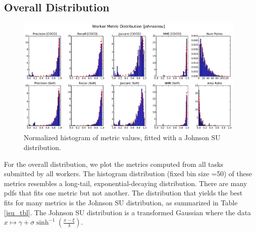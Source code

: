 \documentclass[12pt]{article}
\begin{document}
\subsection{Overall Distribution}
\begin{figure}[ht]
\centering
\includegraphics[width=\linewidth]{plots/johnsonsu_fitted_metric_histogram.pdf}
\caption{Normalized histogram of metric values, fitted with a Johnson SU distribution. }
\label{metric_hist}
\end{figure}
\par For the overall distribution, we plot the metrics computed from all tasks submitted by all workers. The histogram distribution (fixed bin size =50) of these metrics resembles a long-tail, exponential-decaying distribution. There are many pdfs that fits one metric but not another. The distribution that yields the best fits for many metrics is the Johnson SU distribution, as summarized in Table \ref{jsu_tbl}. The Johnson SU distribution is a transformed Gaussian where the data $x\mapsto\gamma+\sigma \sinh^{-1}(\frac{x-\xi}{\lambda})$. 
\end{document}
